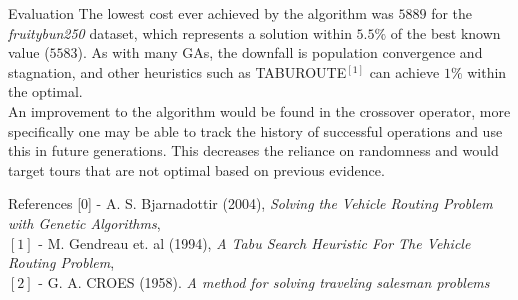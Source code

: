 \documentclass[ %
                    author={Callum Mann},
                     title={Genetic algorithm for the CVRP},
                  subtitle={Capacitated Vehicle Routing Problem},
                      type={Heuristic},
                      year={2016}]{poster}
\begin{document}
\begin{frame}{}
\begin{columns}[t]
\begin{column}{0.450\linewidth}
    \begin{block}{\Large Evaluation}
      The lowest cost ever achieved by the algorithm was $5889$ for the \textit{fruitybun250}
      dataset, which represents a solution within $5.5\%$ of the best known value ($5583$). As with many GAs,
      the downfall is population convergence and stagnation, and other heuristics such as TABUROUTE$^{[1]}$
      can achieve $1\%$ within the optimal. \\ \vspace{1cm}
      An improvement to the algorithm would be found
      in the crossover operator, more specifically one may be able to track the history
      of successful operations and use this in future generations. This decreases the reliance
      on randomness and would target tours that are not optimal based on previous
      evidence.
    \end{block}

    \begin{block}{\Large References}
      [0] - A. S. Bjarnadottir (2004), \textit{Solving the Vehicle Routing Problem with Genetic Algorithms},  \\
      \vspace{0.5cm}
      $[1]$ - M. Gendreau et. al (1994), \textit{A Tabu Search Heuristic For The Vehicle Routing Problem},\\
      $[2]$ - G. A. CROES (1958). \textit{A method for solving traveling salesman problems} \\
    \end{block}
    \vspace{1cm}
  \end{column}
\end{columns}

\vfill

\end{frame}

\end{document}
